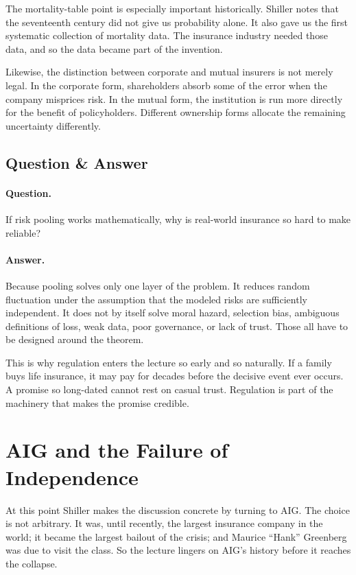 The mortality-table point is especially important historically. Shiller notes that the seventeenth century did not give us probability alone. It also gave us the first systematic collection of mortality data. The insurance industry needed those data, and so the data became part of the invention.

Likewise, the distinction between corporate and mutual insurers is not merely legal. In the corporate form, shareholders absorb some of the error when the company misprices risk. In the mutual form, the institution is run more directly for the benefit of policyholders. Different ownership forms allocate the remaining uncertainty differently.

\subsection{Question \& Answer}

\paragraph{Question.} If risk pooling works mathematically, why is real-world insurance so hard to make reliable?

\paragraph{Answer.} Because pooling solves only one layer of the problem. It reduces random fluctuation under the assumption that the modeled risks are sufficiently independent. It does not by itself solve moral hazard, selection bias, ambiguous definitions of loss, weak data, poor governance, or lack of trust. Those all have to be designed around the theorem.

This is why regulation enters the lecture so early and so naturally. If a family buys life insurance, it may pay for decades before the decisive event ever occurs. A promise so long-dated cannot rest on casual trust. Regulation is part of the machinery that makes the promise credible.

\section{AIG and the Failure of Independence}

At this point Shiller makes the discussion concrete by turning to AIG. The choice is not arbitrary. It was, until recently, the largest insurance company in the world; it became the largest bailout of the crisis; and Maurice ``Hank'' Greenberg was due to visit the class. So the lecture lingers on AIG's history before it reaches the collapse.

